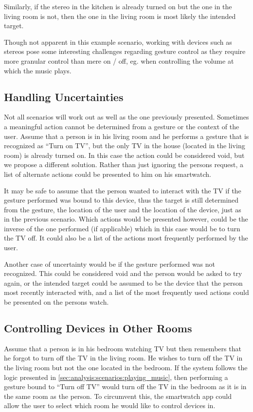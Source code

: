 Similarly, if the stereo in the kitchen is already turned on but the one in the living room is not, then the one in the living room is most likely the intended target.

Though not apparent in this example scenario, working with devices such as stereos pose some interesting challenges regarding gesture control as they require more granular control than mere on / off, eg. when controlling the volume at which the music plays.

\subsection{Handling Uncertainties}
\label{sec:analysis:scenarios:handling_uncertainties}

Not all scenarios will work out as well as the one previously presented.
Sometimes a meaningful action cannot be determined from a gesture or the context of the user.
Assume that a person is in his living room and he performs a gesture that is recognized as ``Turn on TV'', but the only TV in the house (located in the living room) is already turned on.
In this case the action could be considered void, but we propose a different solution.
Rather than just ignoring the persons request, a list of alternate actions could be presented to him on his smartwatch.

It may be safe to assume that the person wanted to interact with the TV if the gesture performed was bound to this device, thus the target is still determined from the gesture, the location of the user and the location of the device, just as in the previous scenario.
Which actions would be presented however, could be the inverse of the one performed (if applicable) which in this case would be to turn the TV off.
It could also be a list of the actions most frequently performed by the user.

Another case of uncertainty would be if the gesture performed was not recognized.
This could be considered void and the person would be asked to try again, or the intended target could be assumed to be the device that the person most recently interacted with, and a list of the most frequently used actions could be presented on the persons watch.

\subsection{Controlling Devices in Other Rooms}
\label{sec:analysis:scenarios:other_rooms}

Assume that a person is in his bedroom watching TV but then remembers that he forgot to turn off the TV in the living room.
He wishes to turn off the TV in the living room but not the one located in the bedroom.
If the system follows the logic presented in \cref{sec:analysis:scenarios:playing_music}, then performing a gesture bound to ``Turn off TV'' would turn off the TV in the bedroom as it is in the same room as the person.
To circumvent this, the smartwatch app could allow the user to select which room he would like to control devices in.

